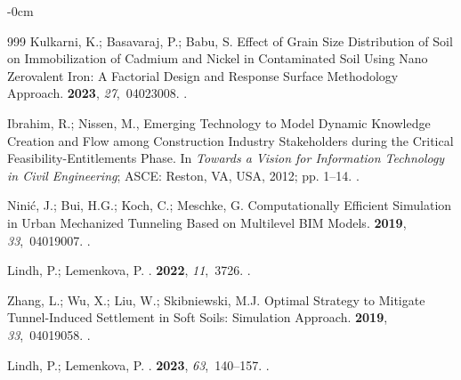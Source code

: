 \documentclass[algorithms,article,accept,pdftex,moreauthors]{Definitions/mdpi}
\begin{document}
\begin{adjustwidth}{-\extralength}{0cm}
\begin{thebibliography}{999}
Kulkarni, K.; Basavaraj, P.; Babu, S.
\newblock Effect of Grain Size Distribution of Soil on Immobilization of
  Cadmium and Nickel in Contaminated Soil Using Nano Zerovalent Iron: A
  Factorial Design and Response Surface Methodology Approach.
 {\bf 2023},
  {\em 27},~04023008.
.

Ibrahim, R.; Nissen, M., Emerging Technology to Model Dynamic Knowledge
  Creation and Flow among Construction Industry Stakeholders during the
  Critical Feasibility-Entitlements Phase.
\newblock In {\em Towards a Vision for Information Technology in Civil
  Engineering}; ASCE: Reston, VA, USA, 2012; pp. 1--14. %
.

Ninić, J.; Bui, H.G.; Koch, C.; Meschke, G.
\newblock Computationally Efficient Simulation in Urban Mechanized Tunneling
  Based on Multilevel BIM Models.
 {\bf 2019}, {\em
  33},~04019007.
.

Lindh, P.; Lemenkova, P.
.
 {\bf 2022}, {\em 11},~3726.
.

Zhang, L.; Wu, X.; Liu, W.; Skibniewski, M.J.
\newblock Optimal Strategy to Mitigate Tunnel-Induced Settlement in Soft Soils:
  Simulation Approach.
 {\bf 2019},
  {\em 33},~04019058.
.

Lindh, P.; Lemenkova, P.
.
 {\bf 2023}, {\em 63},~140--157.
.


\end{thebibliography}
\end{adjustwidth}
\end{document}
